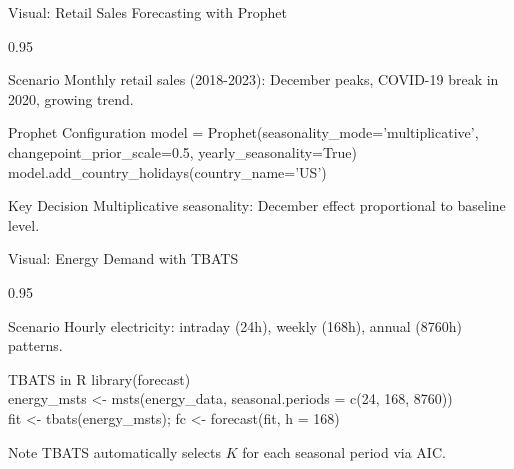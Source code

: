 \documentclass[9pt, aspectratio=169, t]{beamer}
\begin{document}
\begin{frame}{Visual: Retail Sales Forecasting with Prophet}
    \begin{cminipage}{0.95\textwidth}
    {\footnotesize
    \begin{block}{Scenario}
        Monthly retail sales (2018-2023): December peaks, COVID-19 break in 2020, growing trend.
    \end{block}
    \begin{exampleblock}{Prophet Configuration}
        {\scriptsize\ttfamily
        model = Prophet(seasonality\_mode='multiplicative',\\
        \quad changepoint\_prior\_scale=0.5, yearly\_seasonality=True)\\
        model.add\_country\_holidays(country\_name='US')
        }
    \end{exampleblock}
    \begin{alertblock}{Key Decision}
        Multiplicative seasonality: December effect proportional to baseline level.
    \end{alertblock}
    }

    \end{cminipage}
\end{frame}

\begin{frame}{Visual: Energy Demand with TBATS}
    \begin{cminipage}{0.95\textwidth}
    {\footnotesize
    \begin{block}{Scenario}
        Hourly electricity: intraday (24h), weekly (168h), annual (8760h) patterns.
    \end{block}
    \begin{exampleblock}{TBATS in R}
        {\scriptsize\ttfamily
        library(forecast)\\
        energy\_msts <- msts(energy\_data, seasonal.periods = c(24, 168, 8760))\\
        fit <- tbats(energy\_msts); fc <- forecast(fit, h = 168)
        }
    \end{exampleblock}
    \begin{alertblock}{Note}
        TBATS automatically selects $K$ for each seasonal period via AIC.
    \end{alertblock}
    }

    \end{cminipage}
\end{frame}
\end{document}
